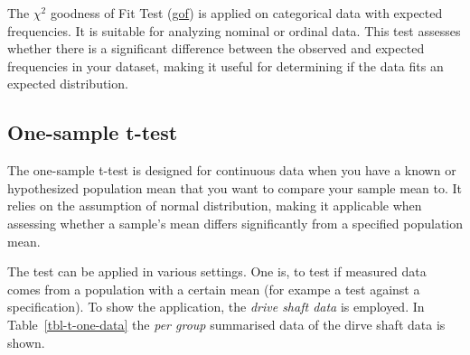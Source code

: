 \documentclass[
  a4paper,
]{scrbook}
\begin{document}
\begin{table}

\caption{\label{tbl-chi-gof-res}The test results for the gof \(\chi^2\)
test.}


\end{table}%

The \(\chi^2\) goodness of Fit Test (\hyperref[gof]{gof}) is applied on
categorical data with expected frequencies. It is suitable for analyzing
nominal or ordinal data. This test assesses whether there is a
significant difference between the observed and expected frequencies in
your dataset, making it useful for determining if the data fits an
expected distribution.

\subsection{One-sample t-test}\label{one-sample-t-test}

The one-sample t-test is designed for continuous data when you have a
known or hypothesized population mean that you want to compare your
sample mean to. It relies on the assumption of normal distribution,
making it applicable when assessing whether a sample's mean differs
significantly from a specified population mean.

The test can be applied in various settings. One is, to test if measured
data comes from a population with a certain mean (for exampe a test
against a specification). To show the application, the \emph{drive shaft
data} is employed. In Table~\ref{tbl-t-one-data} the \emph{per group}
summarised data of the dirve shaft data is shown.

\begin{table}

\caption{\label{tbl-t-one-data}The raw data for the one sample t-test.}


\end{table}%
\end{document}
